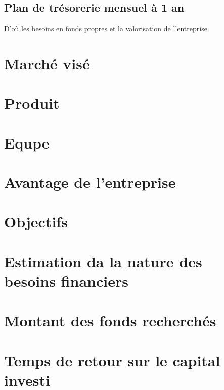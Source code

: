 	\subsection{Plan de trésorerie mensuel à 1 an}
D'où les besoins en fonds propres et la valorisation de l'entreprise











































\section{Marché visé}
\section{Produit}
\section{Equpe}
\section{Avantage de l'entreprise}
\section{Objectifs}
\section{Estimation da la nature des besoins financiers}
\section{Montant des fonds recherchés}
\section{Temps de retour sur le capital investi}
